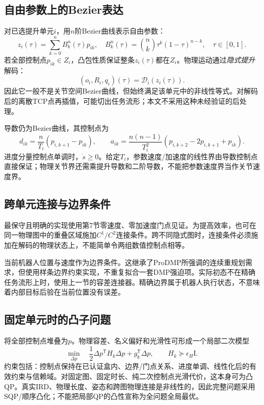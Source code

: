 \documentclass[UTF8,11pt,a4paper,fontset=fandol]{ctexart}
\numberwithin{equation}{section}
\theoremstyle{definition}
\newcommand{\Id}{\mathrm I}
\newcommand{\T}{^{\mathsf T}}
\begin{document}
\subsection{自由参数上的Bezier表达}
对已选提升单元$i$，用$n$阶Bezier曲线表示自由参数：
\begin{equation}
 z_i(\tau)=\sum_{k=0}^{n}B_k^n(\tau)p_{ik},\quad
 B_k^n(\tau)=\binom nk\tau^k(1-\tau)^{n-k},\quad\tau\in[0,1].
 \label{eq:bezier}
\end{equation}
若全部控制点$p_{ik}\in Z_i$，凸包性质保证整条$z_i(\tau)$都在$Z_i$。物理运动通过\emph{隐式提升}解码：
\begin{equation}
 (o_i,R_i,q_i)(\tau)=\mathcal D_i(z_i(\tau)).
 \label{eq:bezierlift}
\end{equation}
因此它一般不是关节空间Bezier曲线，但始终满足该单元中的非线性等式。对解码后的离散TCP点再插值，可能切出任务流形；本文不采用这种未经验证的后处理。

导数仍为Bezier曲线，其控制点为
\begin{equation}
 d_{ik}=\frac n{T_i}(p_{i,k+1}-p_{ik}),\qquad
 a_{ik}=\frac{n(n-1)}{T_i^2}(p_{i,k+2}-2p_{i,k+1}+p_{ik}).
 \label{eq:bezierderivative}
\end{equation}
进度分量控制点单调时，$\dot s\ge0$。给定$T_i$，参数速度/加速度的线性界由导数控制点直接保证；物理关节界还需乘提升导数和二阶导数，不能把参数速度界当作关节速度界。

\subsection{跨单元连接与边界条件}
最保守且明确的实现使用第7节零速度、零加速度门点见证。为提高效率，也可在同一物理图中的重叠区域施加$C^1/C^2$连接条件。跨不同隐式图时，连接条件必须施加在解码的物理状态上，不能简单令两组数值控制点相等。

当前机器人位置与速度作为边界条件。这继承了ProDMP所强调的连续重规划需求，但使用样条边界约束实现，不重复拟合一套DMP强迫项\cite{prodmp2022}。实际初态不在精确任务流形上时，使用上一节的容差连接器。精确边界属于机器人执行状态，不意味着内部目标后验在当前位置没有误差。

\subsection{固定单元时的凸子问题}
将全部控制点堆叠为$p$。物理容差、名义偏好和光滑性可形成一个局部二次模型
\begin{equation}
 \min_{\Delta p}\quad
 \frac12\Delta p\T H_k\Delta p+g_k\T\Delta p,
 \qquad H_k\succeq\epsilon_H\Id.
 \label{eq:qp}
\end{equation}
约束包括：控制点保持在已认证盒内、边界/门点关系、进度单调、线性化后的有效约束与信赖域。对固定图、固定时长、纯二次控制点光滑代价，这本身可为凸QP。真实IRD、物理长度、姿态和跨图物理连接是非线性的，因此完整问题采用SQP/顺序凸化；不能把局部QP的凸性宣称为全问题全局最优。
\end{document}

